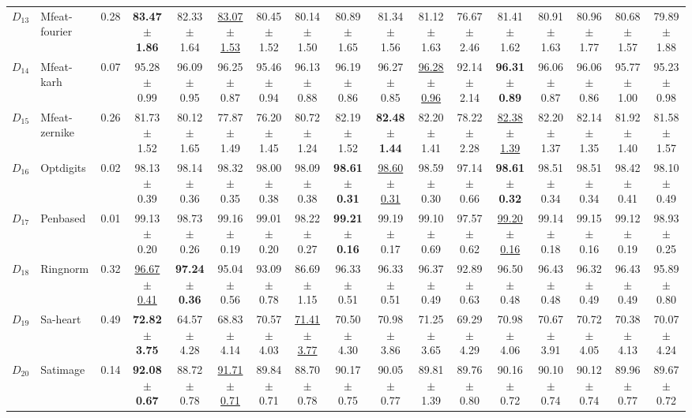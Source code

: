 {\begin{landscape}
\begin{table}[!ht]
\begin{adjustbox}{max width=1.5\textwidth}
\begin{tabular}{llccccccccccccccc}
  $D_{13}$ & Mfeat-fourier & 0.28 &\textbf{83.47 $\pm$ 1.86}& 82.33 $\pm$ 1.64 &\underline{ 83.07 $\pm$ 1.53} & 80.45 $\pm$  1.52 & 80.14 $\pm$ 1.50 & 80.89 $\pm$ 1.65 & 81.34 $\pm$ 1.56 &81.12 $\pm$ 1.63& 76.67 $\pm$ 2.46 & 81.41 $\pm$ 1.62 & 80.91 $\pm$ 1.63 & 80.96 $\pm$ 1.77 & 80.68 $\pm$ 1.57 & 79.89 $\pm$ 1.88 \\ 
  $D_{14}$ & Mfeat-karh & 0.07 &95.28 $\pm$ 0.99& 96.09 $\pm$ 0.95 & 96.25 $\pm$ 0.87& 95.46 $\pm$ 0.94 & 96.13 $\pm$ 0.88 & 96.19 $\pm$ 0.86 & 96.27 $\pm$ 0.85 &\underline{96.28 $\pm$ 0.96}&92.14 $\pm$ 2.14 &\textbf{96.31 $\pm$ 0.89}& 96.06 $\pm$ 0.87 & 96.06 $\pm$ 0.86 & 95.77 $\pm$ 1.00 & 95.23 $\pm$ 0.98 \\ 
  $D_{15}$ & Mfeat-zernike & 0.26 &81.73 $\pm$ 1.52& 80.12 $\pm$ 1.65 & 77.87 $\pm$ 1.49 & 76.20 $\pm$ 1.45 & 80.72 $\pm$ 1.24 & 82.19 $\pm$ 1.52 & \textbf{82.48 $\pm$ 1.44} &82.20 $\pm$ 1.41& 78.22  $\pm$ 2.28 &\underline{ 82.38 $\pm$ 1.39}& 82.20 $\pm$ 1.37 & 82.14 $\pm$ 1.35 & 81.92 $\pm$ 1.40 & 81.58 $\pm$ 1.57 \\ 
  $D_{16}$ & Optdigits & 0.02 &98.13 $\pm$ 0.39& 98.14 $\pm$ 0.36 & 98.32 $\pm$ 0.35 & 98.00 $\pm$ 0.38 & 98.09 $\pm$ 0.38 & \textbf{98.61 $\pm$ 0.31} &\underline{98.60 $\pm$ 0.31} &98.59 $\pm$ 0.30& 97.14 $\pm$ 0.66 & \textbf{98.61 $\pm$ 0.32} & 98.51 $\pm$ 0.34 & 98.51 $\pm$ 0.34 & 98.42 $\pm$ 0.41 & 98.10 $\pm$ 0.49 \\ 
  $D_{17}$ & Penbased & 0.01 &99.13 $\pm$ 0.20& 98.73 $\pm$ 0.26 & 99.16 $\pm$ 0.19 & 99.01 $\pm$ 0.20 & 98.22 $\pm$ 0.27 & \textbf{99.21 $\pm$ 0.16} & 99.19 $\pm$ 0.17 &99.10 $\pm$ 0.69& 97.57 $\pm$ 0.62 & \underline{99.20 $\pm$ 0.16} & 99.14 $\pm$ 0.18 & 99.15 $\pm$ 0.16 & 99.12 $\pm$ 0.19 & 98.93 $\pm$ 0.25 \\ 
  $D_{18}$ & Ringnorm & 0.32 &\underline{96.67 $\pm$ 0.41}& \textbf{97.24 $\pm$ 0.36} & 95.04 $\pm$ 0.56 & 93.09 $\pm$ 0.78 & 86.69 $\pm$ 1.15 & 96.33 $\pm$ 0.51 & 96.33 $\pm$ 0.51 &96.37 $\pm$ 0.49& 92.89 $\pm$ 0.63 & 96.50 $\pm$ 0.48 & 96.43 $\pm$ 0.48 & 96.32 $\pm$ 0.49 & 96.43 $\pm$ 0.49 & 95.89 $\pm$ 0.80 \\ 
  $D_{19}$ & Sa-heart & 0.49 &\textbf{72.82 $\pm$ 3.75}& 64.57 $\pm$ 4.28 & 68.83 $\pm$ 4.14 & 70.57 $\pm$ 4.03 &\underline{71.41 $\pm$ 3.77} & 70.50 $\pm$ 4.30 & 70.98 $\pm$ 3.86 &71.25 $\pm$ 3.65&69.29 $\pm$ 4.29 & 70.98 $\pm$ 4.06 & 70.67 $\pm$ 3.91 & 70.72 $\pm$ 4.05 & 70.38 $\pm$ 4.13 & 70.07 $\pm$ 4.24 \\ 
  $D_{20}$ & Satimage & 0.14&\textbf{92.08 $\pm$ 0.67}& 88.72 $\pm$ 0.78 &\underline{ 91.71 $\pm$ 0.71} & 89.84 $\pm$ 0.71 & 88.70 $\pm$ 0.78 & 90.17 $\pm$ 0.75 & 90.05 $\pm$ 0.77 &89.81 $\pm$ 1.39& 89.76 $\pm$ 0.80 & 90.16 $\pm$ 0.72 & 90.10 $\pm$ 0.74 & 90.12 $\pm$ 0.74 & 89.96 $\pm$ 0.77 & 89.67 $\pm$ 0.72 \\ 

\end{tabular}
\end{adjustbox}
\end{table}
\end{landscape}}
